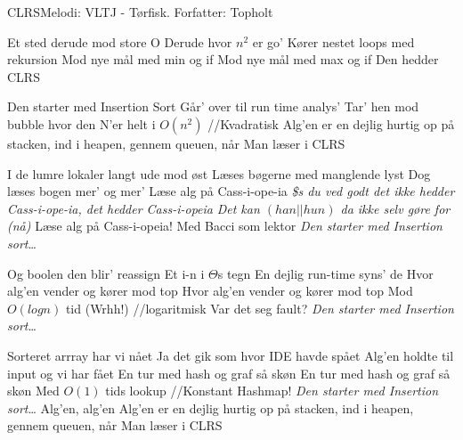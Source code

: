 \begin{sang}{CLRS}{Melodi: VLTJ - Tørfisk. Forfatter: Topholt}
    \begin{vers}
    Et sted derude mod store O
    Derude hvor $n^2$ er go'
    Kører nestet loops med rekursion
    Mod nye mål med min og if
    Mod nye mål med max og if
    Den hedder CLRS
    \end{vers}
    
    \begin{omkvaed}
    Den starter med Insertion Sort
    Går' over til run time analys'
    Tar' hen mod bubble hvor den N'er helt i $O(n^2)$ //Kvadratisk
    Alg'en er en dejlig hurtig op på stacken, ind i heapen, gennem queuen, når
    Man læser i CLRS
    \end{omkvaed}
    
    \begin{vers}
    I de lumre lokaler langt ude mod øst
    Læses bøgerne med manglende lyst
    Dog læses bogen mer' og mer'
    Læse alg på Cass-i-ope-ia
    \textit{\$s du ved godt det ikke hedder Cass-i-ope-ia, det hedder Cass-i-opeia}
    \textit{Det kan $(han||hun)$ da ikke selv gøre for (nå)}
    Læse alg på Cass-i-opeia!
    Med Bacci som lektor
    \emph{Den starter med Insertion sort}\ldots
    \end{vers}
    
    \begin{vers}
    Og boolen den blir' reassign
    Et i-n i $\Theta$s tegn
    En dejlig run-time syns' de
    Hvor alg'en vender og kører mod top
    Hvor alg'en vender og kører mod top
    Mod $O(log n)$ tid (Wrhh!) //logaritmisk
    Var det seg fault?
    \emph{Den starter med Insertion sort}\ldots
    \end{vers}

    \begin{vers}
    Sorteret arrray har vi nået
    Ja det gik som hvor IDE havde spået
    Alg'en holdte til input og vi har fået
    En tur med hash og graf så skøn
    En tur med hash og graf så skøn
    Med $O(1)$ tids lookup //Konstant
    Hashmap!
    \emph{Den starter med Insertion sort}\ldots
    Alg'en, alg'en
    Alg'en er en dejlig hurtig op på stacken, ind i heapen, gennem queuen, når
    Man læser i CLRS
    \end{vers}
\end{sang}